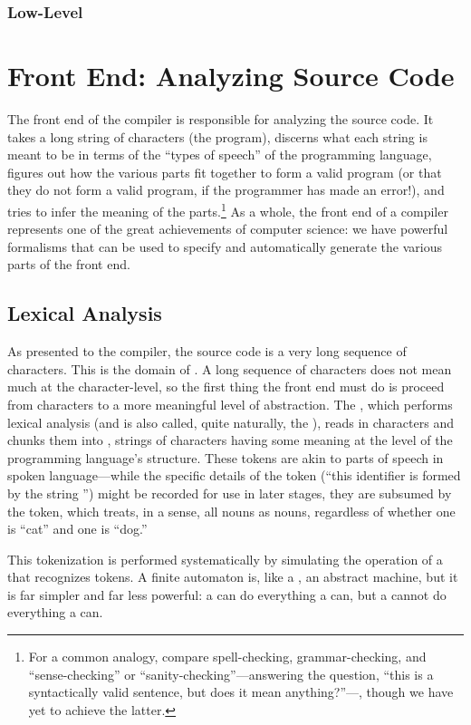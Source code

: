 \subsubsection{Low-Level}

\section{Front End: Analyzing Source Code}
The front end of the compiler is responsible for analyzing the source code. It takes a long string of characters (the program), discerns what each string is meant to be in terms of the ``types of speech'' of the programming language, figures out how the various parts fit together to form a valid program (or that they do not form a valid program, if the programmer has made an error!), and tries to infer the meaning of the parts.\footnote{For a common analogy, compare spell-checking, grammar-checking, and ``sense-checking'' or ``sanity-checking''---answering the question, ``this is a syntactically valid sentence, but does it mean anything?''---, though we have yet to achieve the latter.} As a whole, the front end of a compiler represents one of the great achievements of computer science: we have powerful formalisms that can be used to specify and automatically generate the various parts of the front end.

\subsection{Lexical Analysis}
As presented to the compiler, the source code is a very long sequence of characters. This is the domain of . A long sequence of characters does not mean much at the character-level, so the first thing the front end must do is proceed from characters to a more meaningful level of abstraction. The , which performs lexical analysis (and is also called, quite naturally, the ), reads in characters and chunks them into , strings of characters having some meaning at the level of the programming language's structure. These tokens are akin to parts of speech in spoken language---while the specific details of the token (``this identifier is formed by the string '') might be recorded for use in later stages, they are subsumed by the token, which treats, in a sense, all nouns as nouns, regardless of whether one is ``cat'' and one is ``dog.''

This tokenization is performed systematically by simulating the operation of a  that recognizes tokens. A finite automaton is, like a \TM, an abstract machine, but it is far simpler and far less powerful: a \TM can do everything a \FA can, but a \FA cannot do everything a \TM can.

